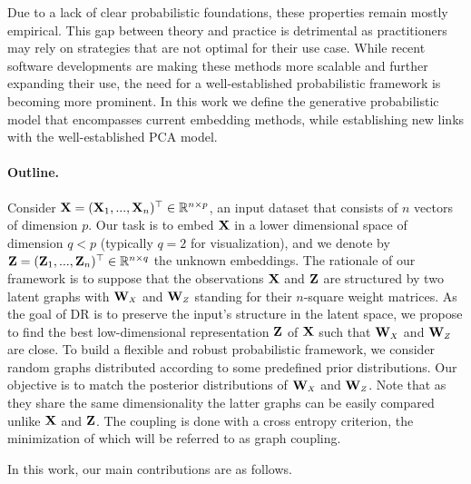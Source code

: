 Due to a lack of clear probabilistic foundations, these properties remain mostly empirical. This gap between theory and practice is detrimental as practitioners may rely on strategies that are not optimal for their use case.
While recent software developments are making these methods more scalable \cite{chan2018t,pezzotti2019gpgpu,linderman2019fast} and further expanding their use, the need for a well-established probabilistic framework is becoming more prominent.
In this work we define the generative probabilistic model that encompasses current embedding methods, while establishing new links with the well-established PCA model.

\paragraph{Outline.} 
Consider $\mathbf{X} = (\mathbf{X}_1,..., \mathbf{X}_n)^\top \in \mathbb{R}^{n \times p}$, an input dataset that consists of $n$ vectors of dimension $p$. Our task is to embed $\mathbf{X}$ in a lower dimensional space of dimension $q<p$ (typically $q=2$ for visualization), and we denote by $\mathbf{Z} = (\mathbf{Z}_1, ..., \mathbf{Z}_n)^\top \in \mathbb{R}^{n \times q}$ the unknown embeddings. The rationale of our framework is to suppose that the observations $\mathbf{X}$ and $\mathbf{Z}$ are structured by two latent graphs with $\W_{\scaleto{X}{4pt}}$ and $\W_{\scaleto{Z}{4pt}}$ standing for their $n$-square weight matrices.
As the goal of DR is to preserve the input's structure in the latent space, we propose to find the best low-dimensional representation $\mathbf{Z}$ of $\mathbf{X}$ such that $\W_{\scaleto{X}{4pt}}$ and $\W_{\scaleto{Z}{4pt}}$ are close. To build a flexible and robust probabilistic framework, we consider random graphs distributed according to some predefined prior distributions. Our objective is to match the posterior distributions of $\W_{\scaleto{X}{4pt}}$ and $\W_{\scaleto{Z}{4pt}}$. Note that as they share the same dimensionality the latter graphs can be easily compared unlike $\mathbf{X}$ and $\mathbf{Z}$. The coupling is done with a cross entropy criterion, the minimization of which will be referred to as graph coupling.

In this work, our main contributions are as follows.

